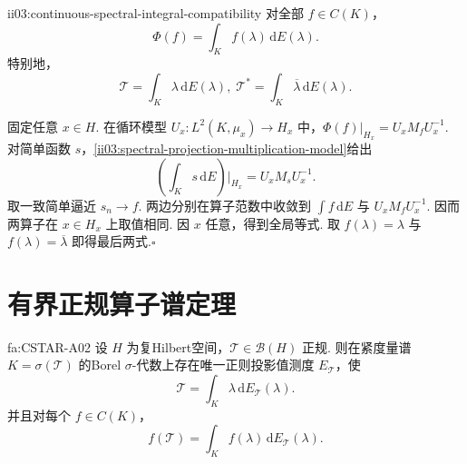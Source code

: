 \begin{FAProposition}[B][连续函数演算与谱积分一致]{ii03:continuous-spectral-integral-compatibility}
对全部 \(\displaystyle f\in C(K)\)，
\[
\Phi(f)=\int_K f(\lambda)\,\mathrm{d}E(\lambda).
\]
特别地，
\[
\mathcal T=\int_K\lambda\,\mathrm{d}E(\lambda),
\;
\mathcal T^*=\int_K\overline\lambda\,\mathrm{d}E(\lambda).
\]
\end{FAProposition}

\begin{FAProof}
固定任意 \(\displaystyle x\in H\). 在循环模型 \(\displaystyle U_x:L^2(K,\mu_x)\to H_x\) 中，\(\displaystyle\Phi(f)|_{H_x}=U_xM_fU_x^{-1}\). 对简单函数 \(\displaystyle s\)，\autoref{ii03:spectral-projection-multiplication-model}给出
\[
\left(\int_K s\,\mathrm{d}E\right)\bigg|_{H_x}
=U_xM_sU_x^{-1}.
\]
取一致简单逼近 \(\displaystyle s_n\to f\). 两边分别在算子范数中收敛到 \(\displaystyle\int f\,\mathrm{d}E\) 与 \(\displaystyle U_xM_fU_x^{-1}\). 因而两算子在 \(\displaystyle x\in H_x\) 上取值相同. 因 \(\displaystyle x\) 任意，得到全局等式. 取 \(\displaystyle f(\lambda)=\lambda\) 与 \(\displaystyle f(\lambda)=\overline\lambda\) 即得最后两式.\hfill\(\square\)
\end{FAProof}

\section{有界正规算子谱定理}\label{sec:ii03-bounded-normal-spectral-theorem}

\begin{FATheorem}[A][有界正规算子谱定理]{fa:CSTAR-A02}
设 \(\displaystyle H\) 为复Hilbert空间，\(\displaystyle\mathcal T\in\mathcal B(H)\) 正规. 则在紧度量谱 \(\displaystyle K=\sigma(\mathcal T)\) 的Borel \(\displaystyle\sigma\)-代数上存在唯一正则投影值测度 \(\displaystyle E_{\mathcal T}\)，使
\[
\mathcal T
=\int_K\lambda\,\mathrm{d}E_{\mathcal T}(\lambda).
\]
并且对每个 \(\displaystyle f\in C(K)\)，
\[
f(\mathcal T)
=\int_K f(\lambda)\,\mathrm{d}E_{\mathcal T}(\lambda).
\]
\end{FATheorem}

